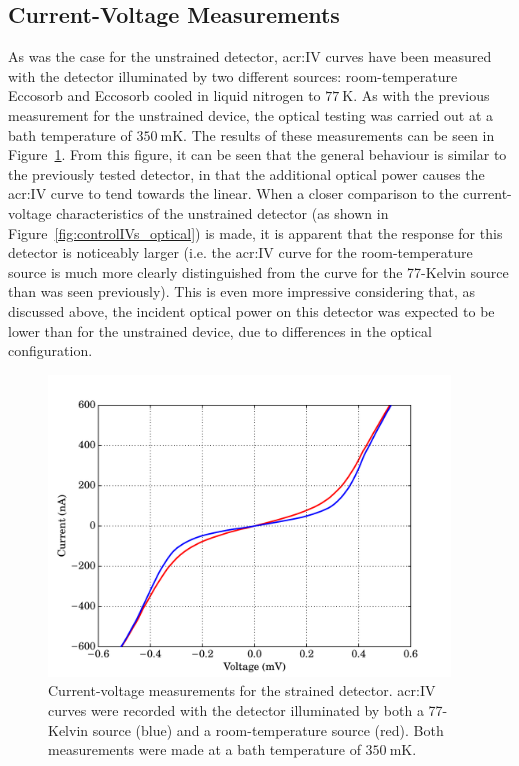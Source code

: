 \subsection{Current-Voltage Measurements}\label{ssec:opticalStrainedSi_IV}
As was the case for the unstrained detector, \gls{acr:IV} curves have been measured with the detector illuminated by two different sources: room-temperature Eccosorb and Eccosorb cooled in liquid nitrogen to $77~\mathrm{K}$. As with the previous measurement for the unstrained device, the optical testing was carried out at a bath temperature of $350~\mathrm{mK}$. The results of these measurements can be seen in Figure~\ref{fig:strainedIVs_optical}. From this figure, it can be seen that the general behaviour is similar to the previously tested detector, in that the additional optical power causes the \gls{acr:IV} curve to tend towards the linear. When a closer comparison to the current-voltage characteristics of the unstrained detector (as shown in Figure~\ref{fig:controlIVs_optical}) is made, it is apparent that the response for this detector is noticeably larger (i.e. the \gls{acr:IV} curve for the room-temperature source is much more clearly distinguished from the curve for the 77-Kelvin source than was seen previously). This is even more impressive considering that, as discussed above, the incident optical power on this detector was expected to be lower than for the unstrained device, due to differences in the optical configuration.
\begin{figure}[tb]
\begin{center}
\includegraphics[width = 0.95\textwidth]{figures/strained_IVs_77_300}
\caption[Current-voltage measurements for an optically-loaded strained-\gls{acr:SiCEB}]{Current-voltage measurements for the strained detector. \gls{acr:IV} curves were recorded with the detector illuminated by both a 77-Kelvin source (blue) and a room-temperature source (red). Both measurements were made at a bath temperature of $350~\mathrm{mK}$.}
\label{fig:strainedIVs_optical}
\end{center}
\end{figure}
